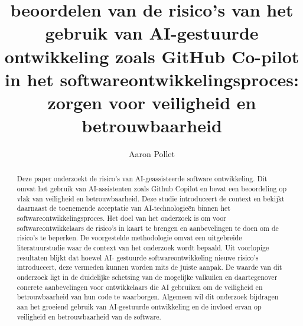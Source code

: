 \documentclass{hogent-article}
\title{beoordelen van de risico's van het gebruik van AI-gestuurde ontwikkeling zoals 
GitHub Co-pilot in het softwareontwikkelingsproces: zorgen voor veiligheid en betrouwbaarheid}
\author{Aaron Pollet}
\begin{document}
\begin{abstract}
{Deze paper onderzoekt de risico’s van AI-geassisteerde software ontwikkeling. 
Dit omvat het gebruik van AI-assistenten zoals Github Copilot en bevat een beoordeling op vlak van 
veiligheid en betrouwbaarheid. Deze studie introduceert de context en bekijkt daarnaast de toenemende acceptatie 
van AI-technologieën binnen het softwareontwikkelingsproces. Het doel van het onderzoek is om voor 
softwareontwikkelaars de risico’s in kaart te brengen en aanbevelingen te doen om de risico’s te beperken. 
De voorgestelde methodologie omvat een uitgebreide literatuurstudie waar de context van het onderzoek wordt bepaald. 
Uit voorlopige resultaten blijkt dat hoewel AI- gestuurde softwareontwikkeling nieuwe risico’s introduceert, 
deze vermeden kunnen worden mits de juiste aanpak. De waarde van dit onderzoek ligt in de duidelijke schetsing van de 
mogelijke valkuilen en daartegenover concrete aanbevelingen voor ontwikkelaars die AI gebruiken om de veiligheid en 
betrouwbaarheid van hun code te waarborgen. Algemeen wil dit onderzoek bijdragen aan het groeiend gebruik van 
AI-gestuurde ontwikkeling en de invloed ervan op veiligheid en betrouwbaarheid van de software.}
\end{abstract}


% 


\end{document}
